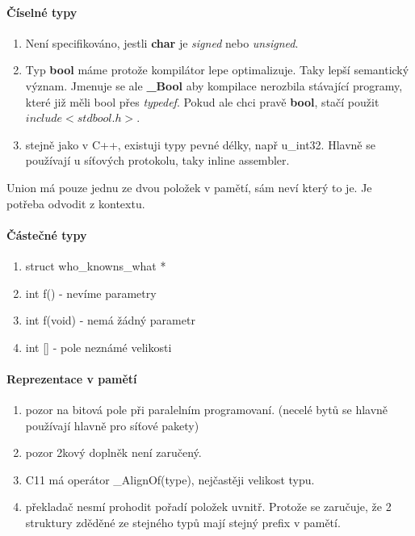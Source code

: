 \paragraph{Číselné typy}
\begin{enumerate}
	\item Není specifikováno, jestli \textbf{char} je \emph{signed} nebo \emph{unsigned}.
	\item Typ \textbf{bool} máme protože kompilátor lepe optimalizuje.
		Taky lepší semantický význam.
		Jmenuje se ale \textbf{\_Bool} aby kompilace nerozbila stávající programy, které již měli bool přes \emph{typedef}.
		Pokud ale chci pravě \textbf{bool}, stačí použit $include <stdbool.h>$.
	\item stejně jako v C++, existuji typy pevné délky, např u\_int32.
		Hlavně se používají u síťových protokolu, taky inline assembler.
\end{enumerate}

Union má pouze jednu ze dvou položek v pamětí, sám neví který to je. Je potřeba odvodit z kontextu.

\paragraph{Částečné typy}
\begin{enumerate}
	\item struct who\_knowns\_what *
	\item int f() - nevíme parametry
	\item int f(void) - nemá žádný parametr
	\item int [] - pole neznámé velikosti
\end{enumerate}

\paragraph{Reprezentace v pamětí}
\begin{enumerate}
	\item pozor na bitová pole při paralelním programovaní. (necelé bytů se hlavně používají hlavně pro síťové pakety)
	\item pozor 2kový doplněk není zaručený.
	\item C11 má operátor \_AlignOf(type), nejčastěji velikost typu.
	\item překladač nesmí prohodit pořadí položek uvnitř.
		Protože se zaručuje, že 2 struktury zděděné ze stejného typů mají stejný prefix v pamětí.
\end{enumerate}

